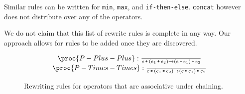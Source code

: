 Similar rules can be written for \texttt{min}, \texttt{max}, and
\texttt{if-then-else}. \texttt{concat} however does not distribute over any of
the operators.


We do not claim that this list of rewrite rules is complete in any way. Our
approach allows for rules to be added once they are discovered.

\begin{figure}[htbp!]
\[
\begin{matrix}
\proc{P-Plus-Plus}:{\over
e \lp \p{e_1 \lp e_2} \rightarrow \p{ e \lp e_1} \lp e_2
}\\
\proc{P-Times-Times}:{\over
e \lt \p{e_1\lt e_2} \rightarrow \p{e \lt e_1} \lt e_2
}\\
\end{matrix}
\]
\caption[]{Rewriting rules for operators that are associative under chaining.}
\label{figure:rewriting-chaining}
\end{figure}

